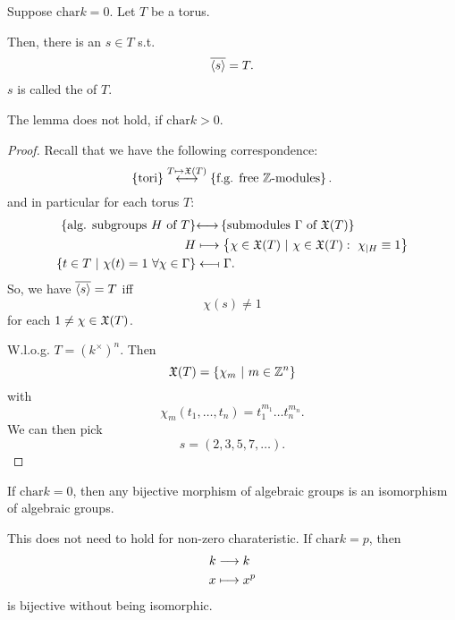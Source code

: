 \begin{lemma}
	Suppose $\mathrm{char} k = 0$. Let $T$ be a torus.
	
	Then, there is an $s \in T$ s.t.
	\[ \overline{\left<s\right>} = T. \]
	$s$ is called the  of $T$.
\end{lemma}
\begin{remark}
	The lemma does not hold, if $\mathrm{char} k > 0$.
\end{remark}
\begin{proof}
	Recall that we have the following correspondence:
	\[ \left\lbrace\text{tori}\right\rbrace \overset{T \mapsto \mathfrak{X}(T)}{\longleftrightarrow} \left\lbrace \text{f.g. free }\mathbb{Z}\text{-modules} \right\rbrace. \]
	and in particular for each torus $T$:
	\begin{align*}
	\left\lbrace\text{alg. subgroups }H\text{ of }T\right\rbrace &{\longleftrightarrow} \left\lbrace \text{submodules }\Gamma\text{ of }\mathfrak{X}(T)  \right\rbrace\\
	H & \longmapsto \left\lbrace\chi \in \mathfrak{X}(T) ~ | ~  \chi \in \mathfrak{X}(T) : ~\chi_{|H} \equiv 1 \right\rbrace\\
	\left\lbrace t \in T ~ | ~ \chi(t) = 1 ~\forall \chi \in \Gamma\right\rbrace &\longleftarrow\!\shortmid \Gamma.
	\end{align*}
	So, we have $\overline{\left<s\right>} = T$ iff
	\[ \chi(s) \neq 1 \]
	for each $1\neq \chi \in \mathfrak{X}(T)$.
	
	W.l.o.g. $T = (k^\times)^n$. Then
	\[ \mathfrak{X}(T) = \left\lbrace\chi_m ~ | ~ m \in \mathbb{Z}^n\right\rbrace \]
	with
	\[ \chi_m(t_1,\ldots, t_n) = t_1^{m_1} \ldots t_n^{m_n}. \]
	We can then pick
	\[ s = (2,3,5,7, \ldots). \]
\end{proof}

\begin{lemma}
	If $\mathrm{char} k = 0$, then any bijective morphism of algebraic groups is an isomorphism of algebraic groups.
\end{lemma}
\begin{remark}
	This does not need to hold for non-zero charateristic. If $\mathrm{char} k = p$, then
	\begin{align*}
	k & \overset{}{\longrightarrow} k\\
	x & \longmapsto x^p
	\end{align*}
	is bijective without being isomorphic.
\end{remark}

